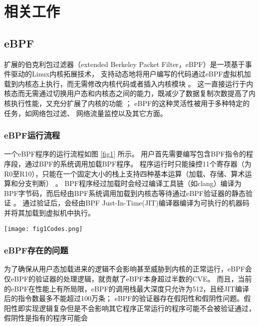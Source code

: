 \section{相关工作}
\label{section:relatedWork}
\subsection{eBPF}
扩展的伯克利包过滤器（extended Berkeley Packet Filter，eBPF）是一项基于事件驱动的Linux内核拓展技术，
支持动态地将用户编写的代码通过eBPF虚拟机加载到内核态上执行，而无需修改内核代码或者插入内核模块
\cite{sunFindingCorrectnessBugs2024, YIHeCrossContainer}。
这一直接运行于内核态而无需通过切换用户态和内核态之间的能力，既减少了数据复制次数提高了内核执行性能，又充分扩展了内核的功能
\cite{YIHeCrossContainer, ZhangZiJunLinuxXiTonge}；
eBPF的这种灵活性被用于多种特定的任务\cite{HaoValidating}，如网络包过滤\cite{10.1145/3371038, TCPdump}、
网络流量监控\cite{9110434}以及其它方面\cite{280870, 258973}。

\subsubsection{eBPF运行流程}
一个eBPF程序的运行流程如图 \ref{fig1} 所示。
用户首先需要编写包含BPF指令的程序段，通过BPF的系统调用加载BPF程序。
程序运行时只能操控11个寄存器（为R0至R10），只能在一个固定大小的栈上支持四种基本运算（加载、存储、算术运算和分支判断）
\cite{HaoValidating}。\nolinebreak
BPF程序经过加载时会经过编译工具链（如clang）编译为BPF字节码，而后经由BPF系统调用加载到内核态等待通过eBPF验证器的静态验证
\cite{zhengBpftimeUserspaceEBPF2023}。\nolinebreak
通过验证后，会经由BPF Just-In-Time(JIT)编译器编译为可执行的机器码并将其加载到虚拟机中执行。

\begin{center}
\begin{figure*}[t] 
    \texttt{[image: fig1Codes.png]}
    \caption{wasm对应的人类可读表示wat示意图}
    \label{fig1}
\end{figure*}
\end{center}

\subsubsection{eBPF存在的问题}
为了确保从用户态加载进来的逻辑不会影响甚至威胁到内核的正常运行，eBPF会
仅eBPF的验证器的处理逻辑，就贡献了eBPF本身超过半数的CVE\cite{hive}。
而且，当前的eBPF在性能上有所局限，eBPF的调用栈最大深度只允许为512，且经JIT编译后的指令数最多不能超过100万条；
eBPF的验证器存在假阳性\cite{hive}和假阴性问题。假阳性即实现逻辑复杂但是不会影响其它程序正常运行的程序可能不会被验证通过，假阴性是指有的程序可能会

